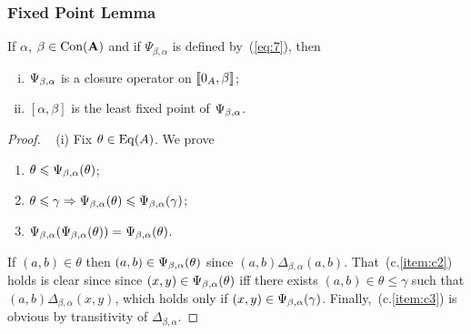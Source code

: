 \subsubsection{Fixed Point Lemma}
\begin{lemma}
  \label{lem:fixed-point-comm}
  If $\alpha$, $\beta\in \operatorname{Con}(\mathbf{A})$ and 
  if $\Psi_{\beta, \alpha}$ is defined by~(\ref{eq:7}), then 
  \begin{enumerate}[(i)]
  \item \label{item:1} $\Psi_{\beta, \alpha}$ is a closure operator on $\llbracket 0_A, \beta\rrbracket$;
  \item \label{item:2} $[\alpha, \beta]$ is the least fixed point of $\Psi_{\beta, \alpha}$.
  \end{enumerate}
\end{lemma}
\begin{proof}\
  \noindent (i) Fix $\theta \in \operatorname{Eq}(A)$.
  \noindent  We prove
  \begin{enumerate}[(c.1)]
  \item \label{item:c1} $\theta \leqslant \Psi_{\beta, \alpha}(\theta)$;     
  \item \label{item:c2} $\theta \leqslant \gamma  \Rightarrow \Psi_{\beta, \alpha}(\theta) \leqslant \Psi_{\beta, \alpha}(\gamma)$;    
  \item \label{item:c3} $\Psi_{\beta, \alpha}(\Psi_{\beta, \alpha}(\theta))  = \Psi_{\beta, \alpha}(\theta)$. 
  \end{enumerate}
  If $(a,b) \in \theta$
  then $(a,b) \in \Psi_{\beta, \alpha}(\theta)$ since $(a,b)\mathrel{\Delta_{\beta, \alpha}} (a,b)$.
  That~(c.\ref{item:c2}) holds is clear since since $(x,y) \in \Psi_{\beta, \alpha}(\theta)$ iff there exists
  $(a,b) \in \theta \leq \gamma$ such that
  $(a,b) \mathrel{\Delta_{\beta, \alpha}} (x,y)$, which holds
  only if $(x,y) \in \Psi_{\beta, \alpha}(\gamma)$.
  Finally,~(c.\ref{item:c3}) is obvious by transitivity of $\Delta_{\beta, \alpha}$.

  \medskip


\end{proof}
